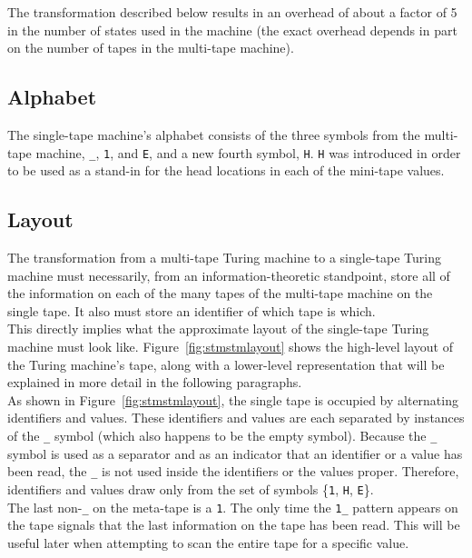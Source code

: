 \documentclass[11pt]{report}
\begin{document}
The transformation described below results in an overhead of about a factor of 5 in the number of states used in the machine (the exact overhead depends in part on the number of tapes in the multi-tape machine). 

\subsection{Alphabet}

The single-tape machine's alphabet consists of the three symbols from the multi-tape machine, \texttt{\_}, \texttt{1}, and \texttt{E}, and a new fourth symbol, \texttt{H}. \texttt{H} was introduced in order to be used as a stand-in for the head locations in each of the mini-tape values.

\subsection{Layout}

The transformation from a multi-tape Turing machine to a single-tape Turing machine must necessarily, from an information-theoretic standpoint, store all of the information on each of the many tapes of the multi-tape machine on the single tape. It also must store an identifier of which tape is which. \\

This directly implies what the approximate layout of the single-tape Turing machine must look like. Figure~\ref{fig:stmstmlayout} shows the high-level layout of the Turing machine's tape, along with a lower-level representation that will be explained in more detail in the following paragraphs. \\

As shown in Figure~\ref{fig:stmstmlayout}, the single tape is occupied by alternating identifiers and values. These identifiers and values are each separated by instances of the \texttt{\_} symbol (which also happens to be the empty symbol). Because the \texttt{\_} symbol is used as a separator and as an indicator that an identifier or a value has been read, the \texttt{\_} is not used inside the identifiers or the values proper. Therefore, identifiers and values draw only from the set of symbols \{\texttt{1}, \texttt{H}, \texttt{E}\}. \\

The last non-\texttt{\_} on the meta-tape is a \texttt{1}. The only time the \texttt{1\_} pattern appears on the tape signals that the last information on the tape has been read. This will be useful later when attempting to scan the entire tape for a specific value.
\end{document}
